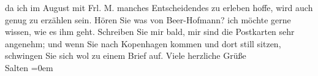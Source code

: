 \begin{ledgroupsized}[t]{13cm}
               da ich im August mit Frl. M. manches
               Entscheidendes zu erleben hoffe, wird auch genug zu erzählen sein. Hören Sie was von
                  Beer-Hofmann? ich möchte gerne wissen, wie
               es ihm geht. Schreiben {\pb}Sie mir
               bald, mir sind die Postkarten sehr angenehm; und wenn Sie nach Kopenhagen kommen und dort still sitzen, schwingen Sie sich
               wol zu einem Brief auf. \pend
           \pstart
           Viele herzliche Grüße {\\[\baselineskip]}\spacefill\mbox{Salten}\pend
           \leftskip=0em{}
         
         \endnumbering{}\end{ledgroupsized}\begin{anhang}\end{anhang}\newcommand{\dateiname}{L03174}\newcommand{\titel}{Felix Salten an Arthur Schnitzler, 14. 7. [1896]}\newcommand{\editorInnen}{Martin Anton Müller und Laura Untner}
      